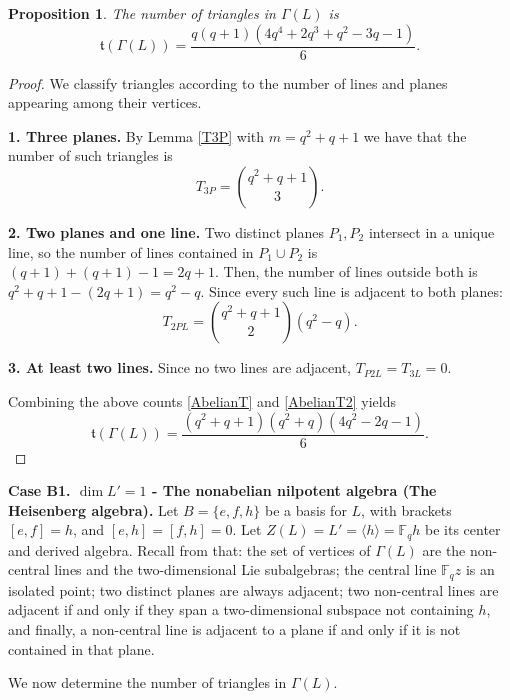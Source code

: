 \documentclass[11pt]{amsart}
\theoremstyle{plain}
\newtheorem{proposition}[theorem]{Proposition}
\def\F{\mathbb{F}}
\begin{document}
\begin{proposition}\label{Abelian}
The number of triangles in $\Gamma(L)$ is
\[\mathfrak{t}(\Gamma(L)) = \frac{q(q+1)(4q^4+2q^3+q^2-3q-1)}{6}.\] %
\end{proposition}

\begin{proof}
We classify triangles according to the number of lines and planes appearing
among their vertices.

\smallskip

\noindent
\textbf{1. Three planes.} By Lemma \ref{T3P} with $m=q^2+q+1$ we have that the number of such triangles is
\begin{equation}\label{AbelianT}
T_{3P} = \binom{q^2+q+1}{3}.
\end{equation}

\noindent \textbf{2. Two planes and one line.} Two distinct planes $P_1, P_2$ intersect in a unique line, so the number of lines contained in $P_1\cup P_2$ is $(q+1)+(q+1)-1 = 2q+1$. Then, the number of lines outside both is $q^2+q+1 -(2q+1) = q^2-q$. Since every such line is adjacent to both planes:
\begin{equation}\label{AbelianT2}
T_{2PL} = \binom{q^2+q+1}{2}(q^2-q).
\end{equation}  

\noindent \textbf{3. At least two lines.} Since no two lines are adjacent,  $T_{P2L} = T_{3L} =0$.

Combining the above counts \eqref{AbelianT} and \eqref{AbelianT2} yields
\[\mathfrak{t}(\Gamma(L)) = \frac{(q^2+q+1)(q^2+q)(4q^2-2q-1)}{6}.\]
\end{proof}

\textbf{Case B1. $\dim L'=1$ - The nonabelian nilpotent algebra (The Heisenberg algebra).}
Let $B= \{e,f,h\}$ be a basis for $L$, with brackets $[e,f]=h$, and $[e,h]=[f,h]=0$. Let $Z(L) = L' = \langle h\rangle = \F_q h$ be its center and derived algebra. Recall from \cite[Proposition 4.3]{TZG} that: the set of vertices of $\Gamma(L)$ are the non-central lines and the two-dimensional Lie subalgebras; the central line $\F_q z$ is an isolated point; two distinct planes are always adjacent; two non-central lines are adjacent if and only if they span a two-dimensional subspace not containing $h$, and finally, a non-central line is adjacent to a plane if and only if it is not contained in that plane.

We now determine the number of triangles in $\Gamma(L)$.
\end{document}
